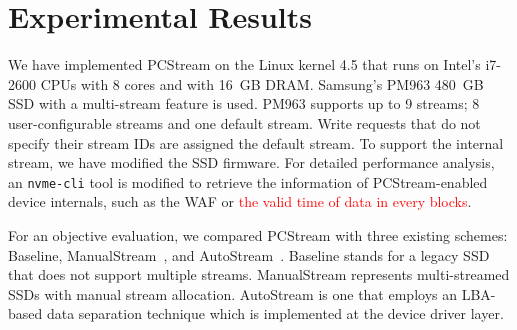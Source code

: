 \section{Experimental Results}

We have implemented \textsf{PCStream} on the Linux kernel 4.5 that runs on
Intel's i7-2600 CPUs with 8 cores and with 16~GB DRAM.  Samsung's PM963 480~GB
SSD with a multi-stream feature is used.  PM963 supports up to 9 streams; 8
user-configurable streams and one default stream. Write requests that do not
specify their stream IDs are assigned the default stream.  To support the
internal stream, we have modified the SSD firmware.  For detailed performance
analysis, an \texttt{nvme-cli} tool is modified to retrieve the information of
\textsf{PCStream}-enabled device internals, such as the WAF or
\textcolor{red}{the valid time of data in every blocks}.


For an objective evaluation, we compared \textsf{\small PCStream} with three
existing schemes: \textsf{\small Baseline}, \textsf{\small
ManualStream}~\cite{MultiStream}, and \textsf{\small
AutoStream}~\cite{AutoStream}.  \textsf{\small Baseline} stands for a legacy
SSD that does not support multiple streams. \textsf{\small ManualStream}
represents multi-streamed SSDs with manual stream allocation.  \textsf{\small
AutoStream} is one that employs an LBA-based data separation technique which is
implemented at the device driver layer. 

